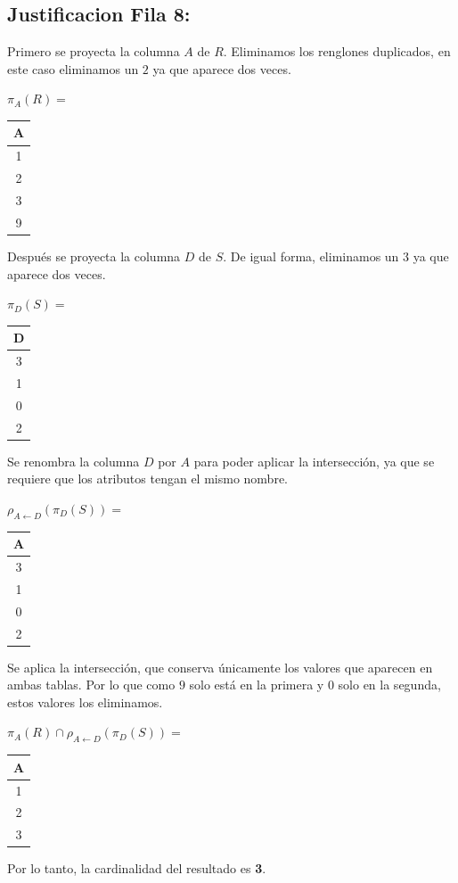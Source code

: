 \subsection*{Justificacion Fila 8:}

Primero se proyecta la columna $A$ de $R$. Eliminamos los renglones duplicados, en este caso eliminamos un $2$ ya que aparece dos veces.

\begin{center}
$\pi_{A}(R) =$ \quad
\begin{tabular}{|c|}
\hline
\textbf{A} \\ \hline
  1 \\
  2 \\
  3 \\
  9 \\ \hline
\end{tabular}
\end{center}

Después se proyecta la columna $D$ de $S$. De igual forma, eliminamos un $3$ ya que aparece dos veces.

\begin{center}
$\pi_{D}(S) =$ \quad
\begin{tabular}{|c|}
\hline
\textbf{D} \\ \hline
  3 \\
  1 \\
  0 \\
  2 \\ \hline
\end{tabular}
\end{center}

Se renombra la columna $D$ por $A$ para poder aplicar la intersección, ya que se requiere que los atributos tengan el mismo nombre.

\begin{center}
$\rho_{A \leftarrow D}(\pi_{D}(S)) =$ \quad
\begin{tabular}{|c|}
\hline
\textbf{A} \\ \hline
  3 \\
  1 \\
  0 \\
  2 \\ \hline
\end{tabular}
\end{center}

Se aplica la intersección, que conserva únicamente los valores que aparecen en ambas tablas. Por lo que como $9$ solo está en la primera y $0$ solo en la segunda, estos valores los eliminamos.

\begin{center}
$\pi_{A}(R) \cap \rho_{A \leftarrow D}(\pi_{D}(S)) =$ \quad
\begin{tabular}{|c|}
\hline
\textbf{A} \\ \hline
  1 \\
  2 \\
  3 \\ \hline
\end{tabular}
\end{center}

Por lo tanto, la cardinalidad del resultado es \textbf{3}.